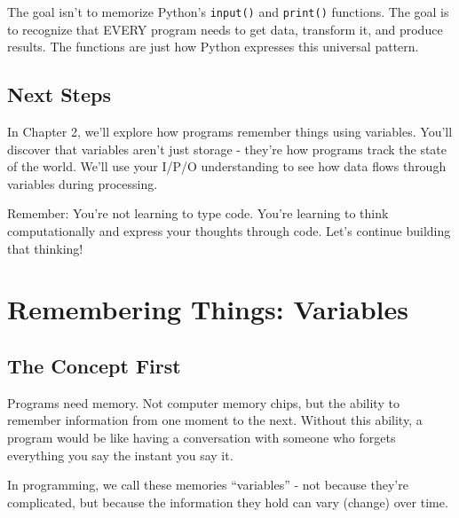 \documentclass[
  letterpaper,
  DIV=11,
  numbers=noendperiod,
  oneside]{scrreprt}
\begin{document}
\begin{tcolorbox}[enhanced jigsaw, opacityback=0, colback=white, colframe=quarto-callout-tip-color-frame, breakable, titlerule=0mm, coltitle=black, rightrule=.15mm, colbacktitle=quarto-callout-tip-color!10!white, left=2mm, bottomtitle=1mm, bottomrule=.15mm, title=\textcolor{quarto-callout-tip-color}{\faLightbulb}\hspace{0.5em}{Learning Tip}, opacitybacktitle=0.6, toptitle=1mm, leftrule=.75mm, arc=.35mm, toprule=.15mm]

The goal isn't to memorize Python's \texttt{input()} and
\texttt{print()} functions. The goal is to recognize that EVERY program
needs to get data, transform it, and produce results. The functions are
just how Python expresses this universal pattern.

\end{tcolorbox}

\section{Next Steps}\label{next-steps-1}

In Chapter 2, we'll explore how programs remember things using
variables. You'll discover that variables aren't just storage - they're
how programs track the state of the world. We'll use your I/P/O
understanding to see how data flows through variables during processing.

Remember: You're not learning to type code. You're learning to think
computationally and express your thoughts through code. Let's continue
building that thinking!

\chapter{Remembering Things: Variables}\label{sec-variables}

\section{The Concept First}\label{the-concept-first-1}

Programs need memory. Not computer memory chips, but the ability to
remember information from one moment to the next. Without this ability,
a program would be like having a conversation with someone who forgets
everything you say the instant you say it.

In programming, we call these memories ``variables'' - not because
they're complicated, but because the information they hold can vary
(change) over time.
\end{document}

